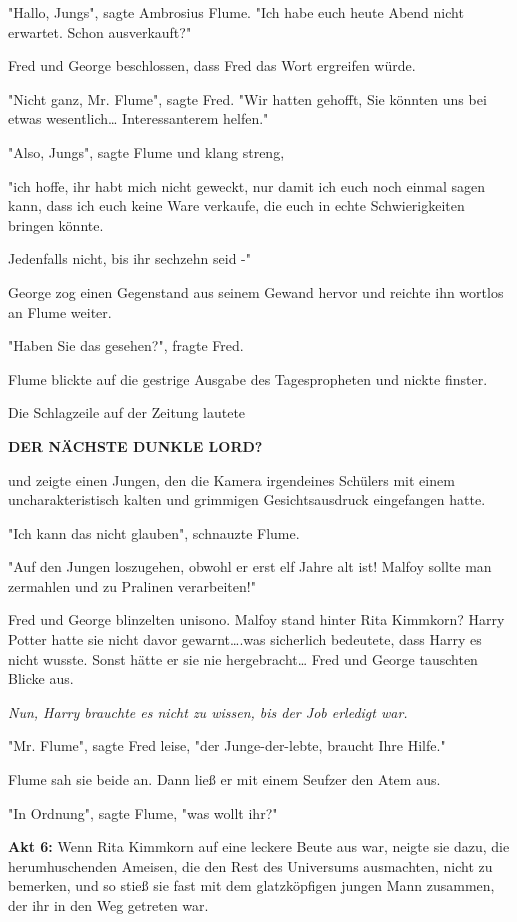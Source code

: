 {"Hallo, Jungs", sagte Ambrosius Flume. "Ich habe euch heute Abend nicht erwartet. Schon ausverkauft?"

Fred und George beschlossen, dass Fred das Wort ergreifen würde.

"Nicht ganz, Mr. Flume", sagte Fred. "Wir hatten gehofft, Sie könnten uns bei etwas wesentlich… Interessanterem helfen."

"Also, Jungs", sagte Flume und klang streng,

"ich hoffe, ihr habt mich nicht geweckt, nur damit ich euch noch einmal sagen kann, dass ich euch keine Ware verkaufe, die euch in echte Schwierigkeiten bringen könnte.

Jedenfalls nicht, bis ihr sechzehn seid -"

George zog einen Gegenstand aus seinem Gewand hervor und reichte ihn wortlos an Flume weiter.

"Haben Sie das gesehen?", fragte Fred.

Flume blickte auf die gestrige Ausgabe des Tagespropheten und nickte finster.

Die Schlagzeile auf der Zeitung lautete

\textbf{DER NÄCHSTE DUNKLE LORD?}

und zeigte einen Jungen, den die Kamera irgendeines Schülers mit einem uncharakteristisch kalten und grimmigen Gesichtsausdruck eingefangen hatte.

"Ich kann das nicht glauben", schnauzte Flume.

"Auf den Jungen loszugehen, obwohl er erst elf Jahre alt ist! Malfoy sollte man zermahlen und zu Pralinen verarbeiten!"

Fred und George blinzelten unisono. Malfoy stand hinter Rita Kimmkorn? Harry Potter hatte sie nicht davor gewarnt….was sicherlich bedeutete, dass Harry es nicht wusste. Sonst hätte er sie nie hergebracht… Fred und George tauschten Blicke aus.

\emph{Nun, Harry brauchte es nicht zu wissen, bis der Job erledigt war.}

"Mr. Flume", sagte Fred leise, "der Junge-der-lebte, braucht Ihre Hilfe."

Flume sah sie beide an. Dann ließ er mit einem Seufzer den Atem aus.

"In Ordnung", sagte Flume, "was wollt ihr?"

\textbf{Akt 6:} Wenn Rita Kimmkorn auf eine leckere Beute aus war, neigte sie dazu, die herumhuschenden Ameisen, die den Rest des Universums ausmachten, nicht zu bemerken, und so stieß sie fast mit dem glatzköpfigen jungen Mann zusammen, der ihr in den Weg getreten war.

}
